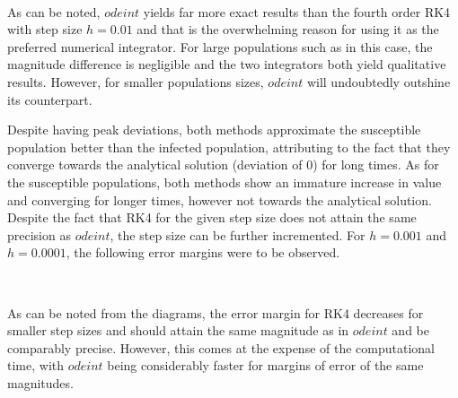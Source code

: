 \documentclass[12pt]{article}
\begin{document}
\begin{figure*}[ht!]
\begin{center}
   \\
   \caption{\label{workflow} (a) Error margin for $odeint$ (b) Error margin for  RK4 - $h = 0.01$}
\end{center}
\end{figure*}
\noindent As can be noted, $odeint$ yields far more exact results than 
the fourth order RK4 with step size $h = 0.01$ and that is the overwhelming 
reason for using it as the preferred numerical integrator. For large populations 
such as in this case, the magnitude difference is negligible and the two integrators 
both yield qualitative results. However, for smaller populations sizes, 
$odeint$ will undoubtedly outshine its counterpart. 

Despite having peak deviations, both methods approximate the susceptible 
population better than the infected population, attributing to the fact 
that they converge towards the analytical solution (deviation of 0) for long times. 
\newpage 
\noindent As for the susceptible populations, both methods show an 
immature increase in value and converging for longer times, however 
not towards the analytical solution. Despite the fact that RK4 for 
the given step size does not attain the same precision as $odeint$, 
the step size can be further incremented. For $h = 0.001$ and $h = 0.0001$, 
the following error margins were to be observed.
\begin{figure*}[ht!]
\begin{center}
   \\
   \caption{\label{workflow} (a) RK4 - $h = 0.0001$ (b) RK4 - $h = 0.001$}
\end{center}
\end{figure*}

\noindent As can be noted from the diagrams, the error margin for RK4 
decreases for smaller step sizes and should attain the same magnitude 
as in $odeint$ and be comparably precise. However, this comes at the 
expense of the computational time, with $odeint$ being considerably 
faster for margins of error of the same magnitudes. 
\end{document}
